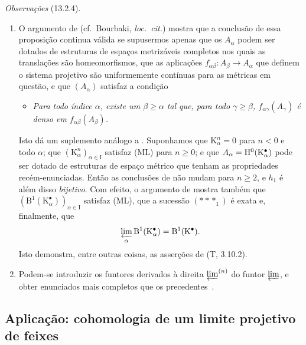 \begin{env}[13.2.4]
\label{0.13.2.4}
\emph{Observações} (13.2.4).
\begin{enumerate}
  \item[{\rm(i)}]
  O argumento de 
  (cf.\ Bourbaki, \emph{loc.\ cit.}) mostra que a conclusão de
  essa proposição continua válida se supusermos apenas que os
  $A_\alpha$ podem ser dotados de estruturas de espaços metrizáveis completos
  nos quais as translações são homeomorfismos, que as aplicações
  $f_{\alpha\beta}:A_\beta\longrightarrow A_\alpha$ que definem o
  sistema projetivo são uniformemente contínuas para as métricas em
  questão, e que $(A_\alpha)$ satisfaz a condição
  \begin{itemize}
    \item[\textbf{(ML')}]
    \emph{Para todo índice $\alpha$, existe um $\beta\geq\alpha$ tal
    que, para todo $\gamma\geq\beta$,
    $f_{\alpha\gamma}(A_\gamma)$ é denso em
    $f_{\alpha\beta}(A_\beta)$.}
  \end{itemize}

  Isto dá um suplemento análogo a .
  Suponhamos que $\mathrm{K}^n_\alpha=0$ para $n<0$ e todo $\alpha$;
  que
  $(\mathrm{K}^n_\alpha)_{\alpha\in\mathrm{I}}$ satisfaz (ML) para
  $n\geq0$; e que
  $A_\alpha=\mathrm{H}^0(\mathrm{K}^\bullet_\alpha)$ pode ser dotado de
  estruturas de espaço métrico que tenham as propriedades recém-enunciadas.
  Então as conclusões de  não mudam para
  $n\geq2$, e $h_1$ é além disso \emph{bijetivo}.
  Com efeito, o argumento de  mostra também que
  $(\mathrm{B}^1(\mathrm{K}^\bullet_\alpha))_{\alpha\in\mathrm{I}}$
  satisfaz (ML), que a sucessão $(***_1)$ é exata e, finalmente,
  que
  \[
    \varprojlim_\alpha
    \mathrm{B}^1(\mathrm{K}^\bullet_\alpha)
    =
    \mathrm{B}^1(\mathrm{K}^\bullet).
  \]
  Isto demonstra, entre outras coisas, as asserções de (T, 3.10.2).

  \item[{\rm(ii)}]
  Podem-se introduzir os funtores derivados à direita
  $\varprojlim^{(n)}$ do funtor $\varprojlim$, e obter enunciados mais
  completos que os precedentes~\cite{III-28}.
\end{enumerate}
\end{env}

\subsection{Aplicação: cohomologia de um limite projetivo de feixes}
\label{subsection:0.13.3}


